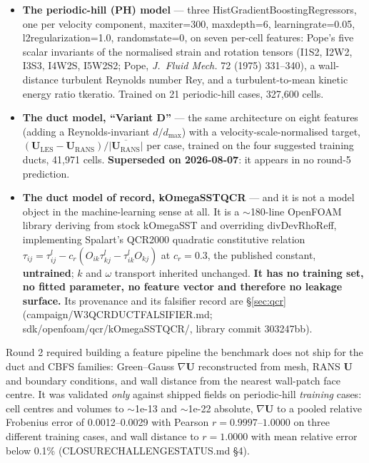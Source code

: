\documentclass[11pt,a4paper]{article}
\newcommand{\breakus}{\textunderscore\allowbreak}
\newcommand{\code}[1]{{\small\ttfamily\let\_\breakus #1}}
\newcommand{\artifact}[1]{{\footnotesize\ttfamily\let\_\breakus #1}}
\begin{document}
\begin{itemize}
\item \textbf{The periodic-hill (PH) model} --- three \code{HistGradientBoostingRegressor}s,
  one per velocity component, \code{max\_iter=300}, \code{max\_depth=6},
  \code{learning\_rate=0.05}, \code{l2\_regularization=1.0}, \code{random\_state=0}, on
  seven per-cell features: Pope's five scalar invariants of the normalised strain and
  rotation tensors (\code{I1\_S2}, \code{I2\_W2}, \code{I3\_S3}, \code{I4\_W2S},
  \code{I5\_W2S2}; Pope, \emph{J.\ Fluid Mech.} 72 (1975) 331--340), a wall-distance
  turbulent Reynolds number \code{Re\_y}, and a turbulent-to-mean kinetic energy ratio
  \code{tke\_ratio}. Trained on 21 periodic-hill cases, 327{,}600 cells.
\item \textbf{The duct model, ``Variant D''} --- the same architecture on eight features
  (adding a Reynolds-invariant $d/d_{\max}$) with a velocity-scale-normalised target,
  $(\mathbf{U}_{\text{LES}} - \mathbf{U}_{\text{RANS}})/\overline{|\mathbf{U}_{\text{RANS}}|}$
  per case, trained on the four suggested training ducts, 41{,}971 cells.
  \textbf{Superseded on 2026-08-07}: it appears in no round-5 prediction.
\item \textbf{The duct model of record, \code{kOmegaSSTQCR}} --- and it is not a model
  object in the machine-learning sense at all. It is a $\sim$180-line OpenFOAM library
  deriving from stock \code{kOmegaSST} and overriding \code{divDevRhoReff}, implementing
  Spalart's QCR2000 quadratic constitutive relation
  $\tau_{ij} = \tau^{l}_{ij} - c_r(O_{ik}\tau^{l}_{kj} - \tau^{l}_{ik}O_{kj})$ at
  $c_r = 0.3$, the published constant, \textbf{untrained}; $k$ and $\omega$ transport
  inherited unchanged. \textbf{It has no training set, no fitted parameter, no feature
  vector and therefore no leakage surface.} Its provenance and its falsifier record are
  \S\ref{sec:qcr} (\artifact{campaign/W3\_QCR\_DUCT\_FALSIFIER.md};
  \code{sdk/openfoam/qcr/kOmegaSSTQCR/}, library commit \code{303247bb}).
\end{itemize}

Round 2 required building a feature pipeline the benchmark does not ship for the duct and
CBFS families: Green--Gauss $\nabla\mathbf{U}$ reconstructed from mesh, RANS $\mathbf{U}$
and boundary conditions, and wall distance from the nearest wall-patch face centre. It was
validated \emph{only} against shipped fields on periodic-hill \emph{training} cases: cell
centres and volumes to $\sim$1e-13 and $\sim$1e-22 absolute, $\nabla\mathbf{U}$ to a pooled
relative Frobenius error of 0.0012--0.0029 with Pearson $r = 0.9997$--$1.0000$ on three
different training cases, and wall distance to $r = 1.0000$ with mean relative error below
0.1\% (\artifact{CLOSURE\_CHALLENGE\_STATUS.md} \S4).
\end{document}
